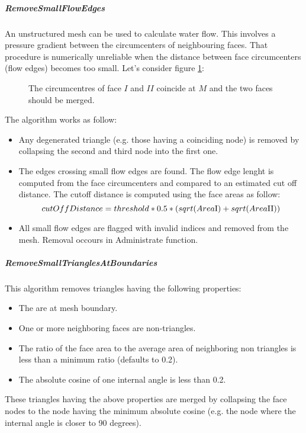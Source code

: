 \documentclass[biblatex]{deltares_manual}
\begin{document}
\subparagraph*{RemoveSmallFlowEdges}
An unstructured mesh can be used to calculate water flow. This involves a pressure gradient between the circumcenters of neighbouring faces. That procedure is numerically unreliable when the distance between face circumcenters (flow edges) becomes too small. Let's consider figure \ref{fig:coincide_circumcenters}:
\begin{figure}[H]
	\begin{center}
		\def\svgwidth{0.45\textwidth}
		\resizebox{0.45\textwidth}{!}{
			
		}
	\end{center}
	\caption{The circumcentres of face $I$ and $II$ coincide at $M$ and the two faces should be merged.}
	\label{fig:coincide_circumcenters}
\end{figure}

The algorithm works as follow:
\begin{itemize}
\item Any degenerated triangle (e.g. those having a coinciding node) is removed by collapsing the second and third node into the first one. 
\item The edges crossing small flow edges are found. The flow edge lenght is computed from the face circumcenters and compared to an estimated cut off distance.
The cutoff distance is computed using the face areas as follow:
\begin{equation}
	cutOffDistance = threshold * 0.5* (sqrt(Area $I$)+sqrt(Area $II$))
\end{equation}
\item All small flow edges are flagged with invalid indices and removed from the mesh. Removal occours in Administrate function.
\end{itemize}

\subparagraph*{RemoveSmallTrianglesAtBoundaries}
This algorithm removes triangles having the following properties:
\begin{itemize}
\item The are at mesh boundary.	
\item One or more neighboring faces are non-triangles.
\item The ratio of the face area to the average area of neighboring non triangles is less than a minimum ratio (defaults to 0.2).
\item The absolute cosine of one internal angle is less than 0.2.
\end{itemize}
These triangles having the above properties are merged by collapsing the face nodes to the node having the minimum absolute cosine (e.g. the node where the internal angle is closer to 90 degrees). 
\end{document}
